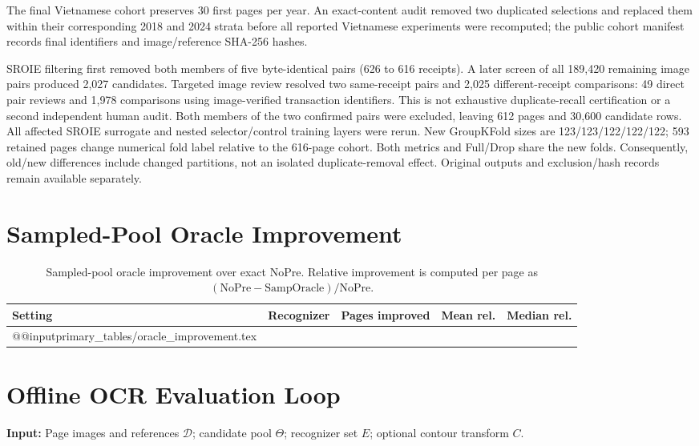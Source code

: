 \documentclass{article}
\makeatletter
\newcommand{\tableinput}[1]{\csname @@input\endcsname #1 }
\makeatother
\begin{document}
The final Vietnamese cohort preserves 30 first pages per year. An exact-content audit removed two duplicated selections and replaced them within their corresponding 2018 and 2024 strata before all reported Vietnamese experiments were recomputed; the public cohort manifest records final identifiers and image/reference SHA-256 hashes.

SROIE filtering first removed both members of five byte-identical pairs (626 to 616 receipts). A later screen of all 189,420 remaining image pairs produced 2,027 candidates. Targeted image review resolved two same-receipt pairs and 2,025 different-receipt comparisons: 49 direct pair reviews and 1,978 comparisons using image-verified transaction identifiers. This is not exhaustive duplicate-recall certification or a second independent human audit. Both members of the two confirmed pairs were excluded, leaving 612 pages and 30,600 candidate rows. All affected SROIE surrogate and nested selector/control training layers were rerun. New GroupKFold sizes are 123/123/122/122/122; 593 retained pages change numerical fold label relative to the 616-page cohort. Both metrics and Full/Drop share the new folds. Consequently, old/new differences include changed partitions, not an isolated duplicate-removal effect. Original outputs and exclusion/hash records remain available separately.

\section{Sampled-Pool Oracle Improvement}

\begin{table}[ht]
\centering
\caption{Sampled-pool oracle improvement over exact NoPre. Relative improvement is computed per page as $(\mathrm{NoPre}-\mathrm{SampOracle})/\mathrm{NoPre}$.}
\label{tab:oracle_improvement}
\small
\begin{tabular}{l l r r r}
\toprule
Setting & Recognizer & Pages improved & Mean rel. & Median rel. \\
\midrule
\tableinput{primary_tables/oracle_improvement.tex}
\bottomrule
\end{tabular}
\end{table}

\section{Offline OCR Evaluation Loop}

\noindent\textbf{Input:} Page images and references \(\mathcal{D}\); candidate pool \(\Theta\); recognizer set \(E\); optional contour transform \(C\).
\end{document}
